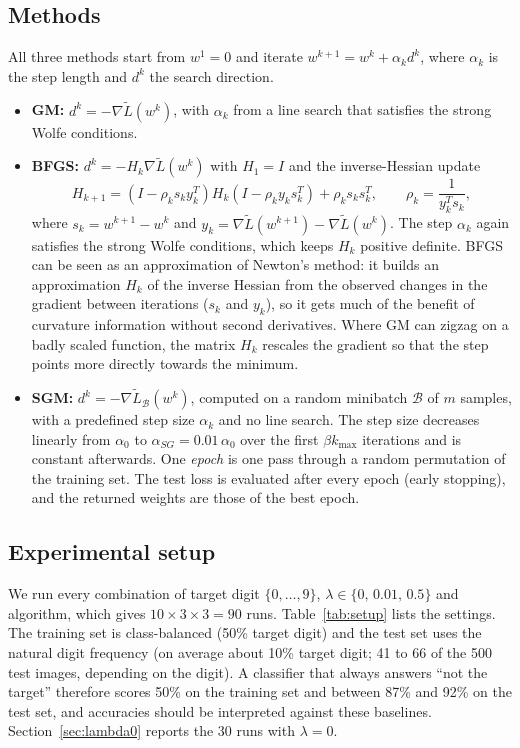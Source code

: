 \documentclass{article}
\begin{document}
\subsection*{Methods}
All three methods start from $w^1 = 0$ and iterate $w^{k+1}=w^k+\alpha_k d^k$, where $\alpha_k$ is the step length and $d^k$ the search direction.
\begin{itemize}
  \item \textbf{GM:} $d^k=-\nabla\tilde L(w^k)$, with $\alpha_k$ from a line search that satisfies the strong Wolfe conditions.
  \item \textbf{BFGS:} $d^k=-H_k\nabla\tilde L(w^k)$ with $H_1=I$ and the inverse-Hessian update
  \[
    H_{k+1}=(I-\rho_k s_k y_k^{T})H_k(I-\rho_k y_k s_k^{T})+\rho_k s_k s_k^{T},\qquad \rho_k=\frac{1}{y_k^{T}s_k},
  \]
  where $s_k=w^{k+1}-w^k$ and $y_k=\nabla\tilde L(w^{k+1})-\nabla\tilde L(w^k)$. The step $\alpha_k$ again satisfies the strong Wolfe conditions, which keeps $H_k$ positive definite. BFGS can be seen as an approximation of Newton's method: it builds an approximation $H_k$ of the inverse Hessian from the observed changes in the gradient between iterations ($s_k$ and $y_k$), so it gets much of the benefit of curvature information without second derivatives. Where GM can zigzag on a badly scaled function, the matrix $H_k$ rescales the gradient so that the step points more directly towards the minimum.
  \item \textbf{SGM:} $d^k=-\nabla\tilde L_{\mathcal B}(w^k)$, computed on a random minibatch $\mathcal B$ of $m$ samples, with a predefined step size $\alpha_k$ and no line search. The step size decreases linearly from $\alpha_0$ to $\alpha_{SG}=0.01\,\alpha_0$ over the first $\beta k_{\max}$ iterations and is constant afterwards. One \emph{epoch} is one pass through a random permutation of the training set. The test loss is evaluated after every epoch (early stopping), and the returned weights are those of the best epoch.
\end{itemize}

\subsection*{Experimental setup}
We run every combination of target digit $\{0,\dots,9\}$, $\lambda\in\{0,\,0.01,\,0.5\}$ and algorithm, which gives $10\times 3\times 3 = 90$ runs. Table~\ref{tab:setup} lists the settings. The training set is class-balanced (50\% target digit) and the test set uses the natural digit frequency (on average about 10\% target digit; 41 to 66 of the 500 test images, depending on the digit). A classifier that always answers ``not the target'' therefore scores 50\% on the training set and between 87\% and 92\% on the test set, and accuracies should be interpreted against these baselines. Section~\ref{sec:lambda0} reports the 30 runs with $\lambda=0$.
\end{document}
